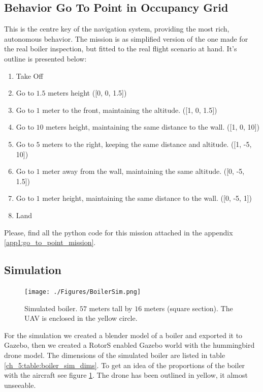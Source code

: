   \subsection{Behavior Go To Point in Occupancy Grid} \label{ch_5:subsect:behav_gtp_mission}

    This is the centre key of the navigation system, providing the most rich, autonomous behavior. The mission is as simplified version of the one made for the real boiler inspection, but fitted to the real flight scenario at hand. It's outline is presented below:

    \begin{enumerate}
      \item Take Off
      \item Go to $1.5$ meters height ([0, 0, 1.5])
      \item Go to $1$ meter to the front, maintaining the altitude. ([1, 0, 1.5])
      \item Go to $10$ meters height, maintaining the same distance to the wall. ([1, 0, 10])
      \item Go to $5$ meters to the right, keeping the same distance and altitude. ([1, -5, 10])
      \item Go to $1$ meter away from the wall, maintaining the same altitude. ([0, -5, 1.5])
      \item Go to $1$ meter height, maintaining the same distance to the wall. ([0, -5, 1])
      \item Land
    \end{enumerate}

    Please, find all the python code for this mission attached in the appendix \ref{app1:go_to_point_mission}.

  \subsection{Simulation} \label{ch_5:subsect:exp_simulation}

    \begin{figure}[!h]
      \centering
      \texttt{[image: ./Figures/BoilerSim.png]}
      \caption{Simulated boiler. $57$ meters tall by $16$ meters (square section). The UAV is enclosed in the yellow circle.}
      \label{ch_5:fig:boiler_sim}
    \end{figure}

    For the simulation we created a blender model of a boiler and exported it to Gazebo, then we created a RotorS enabled Gazebo world with the hummingbird drone model. The dimensions of the simulated boiler are listed in table \ref{ch_5:table:boiler_sim_dims}. To get an idea of the proportions of the boiler with the aircraft see figure \ref{ch_5:fig:boiler_sim}. The drone has been outlined in yellow, it almost unseeable.

